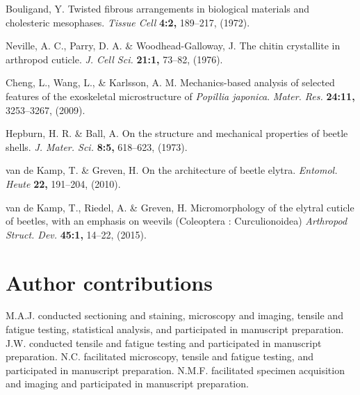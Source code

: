 \documentclass[twocolumn, linenumbers, superscriptaddress, nofootinbib]{revtex4-1}
\begin{document}
\begin{thebibliography}{50}
				Bouligand, Y.
				Twisted fibrous arrangements in biological materials and cholesteric mesophases.
				\textit{Tissue Cell}
				\textbf{4:2,}
				189--217,
				(1972).
				
				Neville, A. C., Parry, D. A. \& Woodhead-Galloway, J.
				The chitin crystallite in arthropod cuticle.
				\textit{J. Cell Sci.}
				\textbf{21:1,}
				73--82,
				(1976).
				
				Cheng, L., Wang, L., \& Karlsson, A. M.
				Mechanics-based analysis of selected features of the exoskeletal microstructure of \textit{Popillia japonica}.
				\textit{Mater. Res.}
				\textbf{24:11,}
				3253--3267,
				(2009).
				
				Hepburn, H. R. \& Ball, A.
				On the structure and mechanical properties of beetle shells.
				\textit{J. Mater. Sci.}
				\textbf{8:5,}
				618--623,
				(1973).
				
				van de Kamp, T. \& Greven, H.
				On the architecture of beetle elytra.
				\textit{Entomol. Heute}
				\textbf{22,}
				191--204,
				(2010).
			
				van de Kamp, T., Riedel, A. \& Greven, H.
				Micromorphology of the elytral cuticle of beetles, with an emphasis on weevils (Coleoptera : Curculionoidea)
				\textit{Arthropod Struct. Dev.}
				\textbf{45:1,}
				14--22,
				(2015).
			
	\end{thebibliography}

	\begin{acknowledgements}

	\end{acknowledgements}

	\section*{Author contributions}
		M.A.J. conducted sectioning and staining, microscopy and imaging, tensile and fatigue testing, statistical analysis, and participated in manuscript preparation.
		J.W. conducted tensile and fatigue testing and participated in manuscript preparation.
		N.C. facilitated microscopy, tensile and fatigue testing, and participated in manuscript preparation.
		N.M.F. facilitated specimen acquisition and imaging and participated in manuscript preparation.
	
\end{document}
